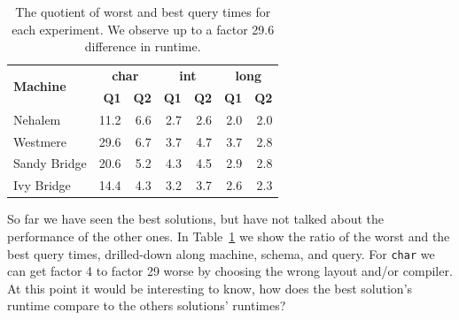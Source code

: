 \documentclass{sig-alternate}
\begin{document}
\begin{table}[!ht]
  \vspace{-10pt}
  \scriptsize
  \centering
  \begin{tabular}{| l || r | r | r | r | r | r |}
    \hline
\multirow{2}{*}{\bf Machine}  &  \multicolumn{2}{c|}{\bf char} &  \multicolumn{2}{c|}{\bf int} & \multicolumn{2}{c|}{\bf long} \\ \cline{2-7}
 & {\bf Q1} & {\bf Q2} & {\bf Q1} & {\bf Q2} & {\bf Q1} & {\bf Q2} \\ \hline \hline
Nehalem & 11.2 & 6.6 & 2.7 & 2.6 & 2.0 & 2.0 \\ \hline
Westmere & 29.6 & 6.7 & 3.7 & 4.7 & 3.7 & 2.8 \\ \hline
Sandy Bridge & 20.6 & 5.2 & 4.3 & 4.5 & 2.9 & 2.8 \\ \hline
Ivy Bridge & 14.4 & 4.3 & 3.2 & 3.7 & 2.6 & 2.3 \\ \hline
    \end{tabular}
    \vspace{-5pt}
    \caption{The quotient of worst and best query times for each experiment. We observe up to a factor 29.6 difference in runtime.}
    \label{tab:fragility}
    \vspace{-5pt}
    \end{table}
So far we have seen the best solutions, but have not talked about the performance of the other ones. In Table~\ref{tab:fragility} we show the ratio of the worst and the best query times, drilled-down along machine, schema, and query. For \texttt{char} we can get factor 4 to factor 29 worse by choosing the wrong layout and/or compiler. At this point it would be interesting to know, how does the best solution's runtime compare to the others solutions' runtimes?




\end{document}
